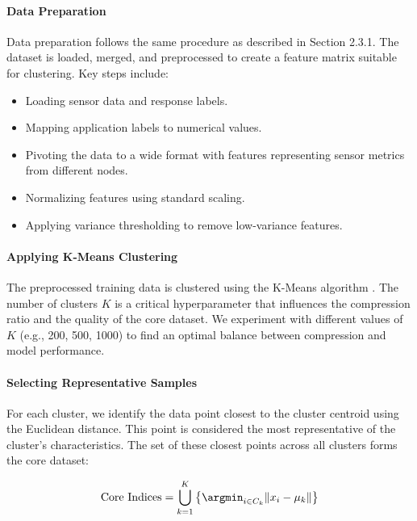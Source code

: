 \documentclass{article}
\begin{document}
\paragraph{Data Preparation}

Data preparation follows the same procedure as described in Section 2.3.1. The dataset is loaded, merged, and preprocessed to create a feature matrix suitable for clustering. Key steps include:

\begin{itemize}
    \item Loading sensor data and response labels.
    \item Mapping application labels to numerical values.
    \item Pivoting the data to a wide format with features representing sensor metrics from different nodes.
    \item Normalizing features using standard scaling.
    \item Applying variance thresholding to remove low-variance features.
\end{itemize}

\paragraph{Applying K-Means Clustering}

The preprocessed training data is clustered using the K-Means algorithm \cite{macqueen1967some}. The number of clusters $K$ is a critical hyperparameter that influences the compression ratio and the quality of the core dataset. We experiment with different values of $K$ (e.g., 200, 500, 1000) to find an optimal balance between compression and model performance.

\paragraph{Selecting Representative Samples}

For each cluster, we identify the data point closest to the cluster centroid using the Euclidean distance. This point is considered the most representative of the cluster's characteristics. The set of these closest points across all clusters forms the core dataset:

\begin{equation}
\text{Core Indices} = \bigcup_{k=1}^{K} \left\{ \argmin_{i \in C_k} \| x_i - \mu_k \| \right\}
\end{equation}
\end{document}
